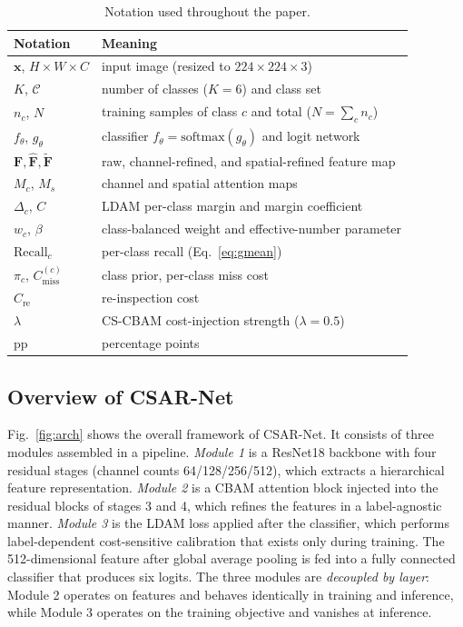 \documentclass[a4paper,fleqn]{cas-sc}
\begin{document}
\begin{sloppypar}
	\begin{table}[pos=htbp]
		\footnotesize
		\caption{Notation used throughout the paper.}
		\label{tbl:notation}
		\centering
		\setlength{\tabcolsep}{2pt}
		\begin{tabular}{ll}
			\hline
			\textbf{Notation} & \textbf{Meaning} \\ \hline
			$\mathbf{x}$, $H{\times}W{\times}C$ & input image (resized to $224{\times}224{\times}3$) \\
			$K$, $\mathcal{C}$ & number of classes ($K=6$) and class set \\
			$n_c$, $N$ & training samples of class $c$ and total ($N=\sum_c n_c$) \\
			$f_\theta$, $g_\theta$ & classifier $f_\theta=\mathrm{softmax}(g_\theta)$ and logit network \\
			$\mathbf{F},\hat{\mathbf{F}},\tilde{\mathbf{F}}$ & raw, channel-refined, and spatial-refined feature map \\
			$M_c$, $M_s$ & channel and spatial attention maps \\
			$\Delta_c$, $C$ & LDAM per-class margin and margin coefficient \\
			$w_c$, $\beta$ & class-balanced weight and effective-number parameter \\
			$\mathrm{Recall}_c$ & per-class recall (Eq.~\eqref{eq:gmean}) \\
			$\pi_c$, $C_{\mathrm{miss}}^{(c)}$ & class prior, per-class miss cost \\
			$C_{\mathrm{re}}$ & re-inspection cost \\
				$\lambda$ & CS-CBAM cost-injection strength ($\lambda=0.5$) \\
				pp & percentage points \\ \hline
		\end{tabular}
	\end{table}

	\subsection{Overview of CSAR-Net}
	\label{sec:overview}
	\par{
		Fig.~\ref{fig:arch} shows the overall framework of CSAR-Net. It consists of three modules assembled in a pipeline. \emph{Module 1} is a ResNet18 backbone \citep{he2016deep} with four residual stages (channel counts 64/128/256/512), which extracts a hierarchical feature representation. \emph{Module 2} is a CBAM attention block \citep{woo2018cbam} injected into the residual blocks of stages 3 and 4, which refines the features in a label-agnostic manner. \emph{Module 3} is the LDAM loss \citep{cao2019learning} applied after the classifier, which performs label-dependent cost-sensitive calibration that exists only during training. The 512-dimensional feature after global average pooling is fed into a fully connected classifier that produces six logits. The three modules are \emph{decoupled by layer}: Module 2 operates on features and behaves identically in training and inference, while Module 3 operates on the training objective and vanishes at inference.
	}


\end{sloppypar}
\end{document}

